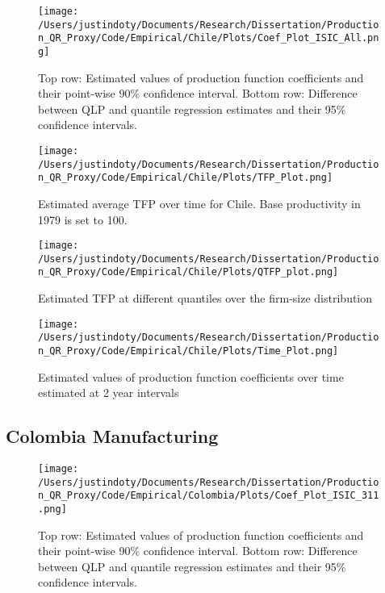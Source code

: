 \documentclass[11pt]{article}
\begin{document}
\begin{figure}[H]
\centering
\texttt{[image: /Users/justindoty/Documents/Research/Dissertation/Production\_QR\_Proxy/Code/Empirical/Chile/Plots/Coef\_Plot\_ISIC\_All.png]}
\caption{Top row: Estimated values of production function coefficients and their point-wise 90\% confidence interval. Bottom row: Difference between QLP and quantile regression estimates and their 95\% confidence intervals.}
\end{figure}

\begin{figure}[H]
\centering
\texttt{[image: /Users/justindoty/Documents/Research/Dissertation/Production\_QR\_Proxy/Code/Empirical/Chile/Plots/TFP\_Plot.png]}
\caption{Estimated average TFP over time for Chile. Base productivity in 1979 is set to 100.}
\end{figure}

\begin{figure}[H]
\centering
\texttt{[image: /Users/justindoty/Documents/Research/Dissertation/Production\_QR\_Proxy/Code/Empirical/Chile/Plots/QTFP\_plot.png]}
\caption{Estimated TFP at different quantiles over the firm-size distribution}
\end{figure}

\begin{figure}[H]
\centering
\texttt{[image: /Users/justindoty/Documents/Research/Dissertation/Production\_QR\_Proxy/Code/Empirical/Chile/Plots/Time\_Plot.png]}
\caption{Estimated values of production function coefficients over time estimated at 2 year intervals}
\end{figure}



\subsection{Colombia Manufacturing}




\begin{figure}[H]
\centering
\texttt{[image: /Users/justindoty/Documents/Research/Dissertation/Production\_QR\_Proxy/Code/Empirical/Colombia/Plots/Coef\_Plot\_ISIC\_311.png]}
\caption{Top row: Estimated values of production function coefficients and their point-wise 90\% confidence interval. Bottom row: Difference between QLP and quantile regression estimates and their 95\% confidence intervals.}
\end{figure}
\end{document}
